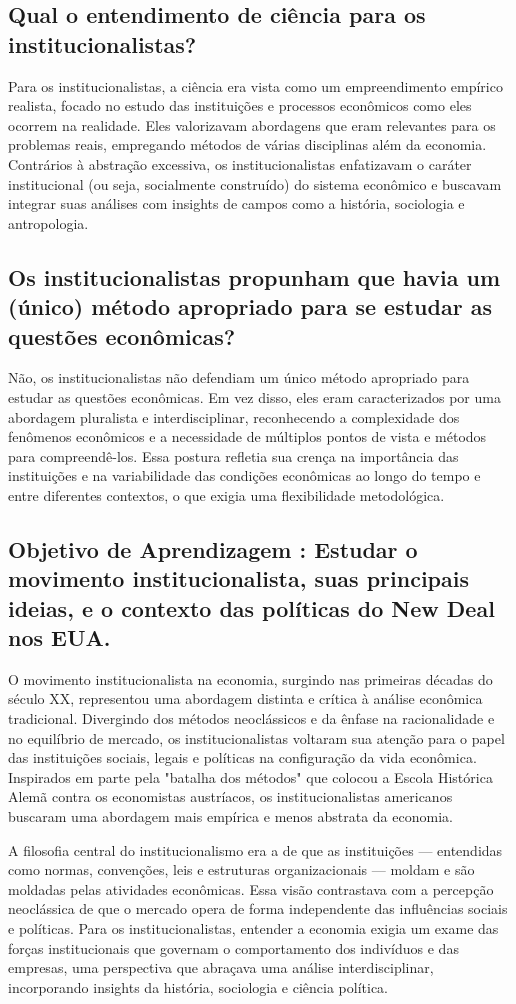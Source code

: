 \documentclass[a4paper,12pt]{article}[abntex2]
\begin{document}
\subsection{\textbf{Qual o entendimento de ciência para os institucionalistas?}}
Para os institucionalistas, a ciência era vista como um empreendimento empírico realista, focado no estudo das instituições e processos econômicos como eles ocorrem na realidade. Eles valorizavam abordagens que eram relevantes para os problemas reais, empregando métodos de várias disciplinas além da economia. Contrários à abstração excessiva, os institucionalistas enfatizavam o caráter institucional (ou seja, socialmente construído) do sistema econômico e buscavam integrar suas análises com insights de campos como a história, sociologia e antropologia.
\subsection{\textbf{Os institucionalistas propunham que havia um (único) método apropriado para se estudar as questões econômicas?}}
Não, os institucionalistas não defendiam um único método apropriado para estudar as questões econômicas. Em vez disso, eles eram caracterizados por uma abordagem pluralista e interdisciplinar, reconhecendo a complexidade dos fenômenos econômicos e a necessidade de múltiplos pontos de vista e métodos para compreendê-los. Essa postura refletia sua crença na importância das instituições e na variabilidade das condições econômicas ao longo do tempo e entre diferentes contextos, o que exigia uma flexibilidade metodológica.
\subsection{\textbf{Objetivo de Aprendizagem : Estudar o movimento institucionalista, suas principais ideias, e o contexto das políticas do New Deal nos EUA.}}
O movimento institucionalista na economia, surgindo nas primeiras décadas do século XX, representou uma abordagem distinta e crítica à análise econômica tradicional. Divergindo dos métodos neoclássicos e da ênfase na racionalidade e no equilíbrio de mercado, os institucionalistas voltaram sua atenção para o papel das instituições sociais, legais e políticas na configuração da vida econômica. Inspirados em parte pela "batalha dos métodos" que colocou a Escola Histórica Alemã contra os economistas austríacos, os institucionalistas americanos buscaram uma abordagem mais empírica e menos abstrata da economia.

A filosofia central do institucionalismo era a de que as instituições — entendidas como normas, convenções, leis e estruturas organizacionais — moldam e são moldadas pelas atividades econômicas. Essa visão contrastava com a percepção neoclássica de que o mercado opera de forma independente das influências sociais e políticas. Para os institucionalistas, entender a economia exigia um exame das forças institucionais que governam o comportamento dos indivíduos e das empresas, uma perspectiva que abraçava uma análise interdisciplinar, incorporando insights da história, sociologia e ciência política.
\end{document}
